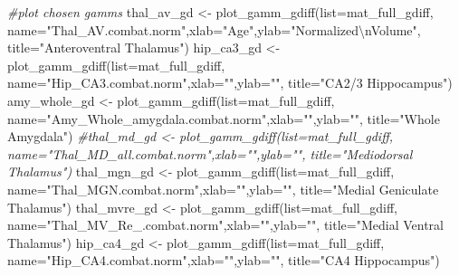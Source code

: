 \documentclass[
]{article}
\newenvironment{Shaded}{\begin{snugshade}}{\end{snugshade}}
\newcommand{\AttributeTok}[1]{\textcolor[rgb]{0.77,0.63,0.00}{#1}}
\newcommand{\CommentTok}[1]{\textcolor[rgb]{0.56,0.35,0.01}{\textit{#1}}}
\newcommand{\FunctionTok}[1]{\textcolor[rgb]{0.00,0.00,0.00}{#1}}
\newcommand{\NormalTok}[1]{#1}
\newcommand{\OtherTok}[1]{\textcolor[rgb]{0.56,0.35,0.01}{#1}}
\newcommand{\SpecialCharTok}[1]{\textcolor[rgb]{0.00,0.00,0.00}{#1}}
\newcommand{\StringTok}[1]{\textcolor[rgb]{0.31,0.60,0.02}{#1}}
\begin{document}
\begin{Shaded}
\begin{Highlighting}[]
\CommentTok{\#plot chosen gamms}
\NormalTok{thal\_av\_gd }\OtherTok{\textless{}{-}} \FunctionTok{plot\_gamm\_gdiff}\NormalTok{(}\AttributeTok{list=}\NormalTok{mat\_full\_gdiff, }\AttributeTok{name=}\StringTok{"Thal\_AV.combat.norm"}\NormalTok{,}\AttributeTok{xlab=}\StringTok{"Age"}\NormalTok{,}\AttributeTok{ylab=}\StringTok{"Normalized}\SpecialCharTok{\textbackslash{}n}\StringTok{Volume"}\NormalTok{, }\AttributeTok{title=}\StringTok{"Anteroventral Thalamus"}\NormalTok{)}
\NormalTok{hip\_ca3\_gd }\OtherTok{\textless{}{-}} \FunctionTok{plot\_gamm\_gdiff}\NormalTok{(}\AttributeTok{list=}\NormalTok{mat\_full\_gdiff, }\AttributeTok{name=}\StringTok{"Hip\_CA3.combat.norm"}\NormalTok{,}\AttributeTok{xlab=}\StringTok{""}\NormalTok{,}\AttributeTok{ylab=}\StringTok{""}\NormalTok{, }\AttributeTok{title=}\StringTok{"CA2/3 Hippocampus"}\NormalTok{)}
\NormalTok{amy\_whole\_gd }\OtherTok{\textless{}{-}} \FunctionTok{plot\_gamm\_gdiff}\NormalTok{(}\AttributeTok{list=}\NormalTok{mat\_full\_gdiff, }\AttributeTok{name=}\StringTok{"Amy\_Whole\_amygdala.combat.norm"}\NormalTok{,}\AttributeTok{xlab=}\StringTok{""}\NormalTok{,}\AttributeTok{ylab=}\StringTok{""}\NormalTok{, }\AttributeTok{title=}\StringTok{"Whole Amygdala"}\NormalTok{)}
\CommentTok{\#thal\_md\_gd \textless{}{-} plot\_gamm\_gdiff(list=mat\_full\_gdiff, name="Thal\_MD\_all.combat.norm",xlab="",ylab="", title="Mediodorsal Thalamus")}
\NormalTok{thal\_mgn\_gd }\OtherTok{\textless{}{-}} \FunctionTok{plot\_gamm\_gdiff}\NormalTok{(}\AttributeTok{list=}\NormalTok{mat\_full\_gdiff, }\AttributeTok{name=}\StringTok{"Thal\_MGN.combat.norm"}\NormalTok{,}\AttributeTok{xlab=}\StringTok{""}\NormalTok{,}\AttributeTok{ylab=}\StringTok{""}\NormalTok{, }\AttributeTok{title=}\StringTok{"Medial Geniculate Thalamus"}\NormalTok{)}
\NormalTok{thal\_mvre\_gd }\OtherTok{\textless{}{-}} \FunctionTok{plot\_gamm\_gdiff}\NormalTok{(}\AttributeTok{list=}\NormalTok{mat\_full\_gdiff, }\AttributeTok{name=}\StringTok{"Thal\_MV\_Re\_.combat.norm"}\NormalTok{,}\AttributeTok{xlab=}\StringTok{""}\NormalTok{,}\AttributeTok{ylab=}\StringTok{""}\NormalTok{, }\AttributeTok{title=}\StringTok{"Medial Ventral Thalamus"}\NormalTok{)}
\NormalTok{hip\_ca4\_gd }\OtherTok{\textless{}{-}} \FunctionTok{plot\_gamm\_gdiff}\NormalTok{(}\AttributeTok{list=}\NormalTok{mat\_full\_gdiff, }\AttributeTok{name=}\StringTok{"Hip\_CA4.combat.norm"}\NormalTok{,}\AttributeTok{xlab=}\StringTok{""}\NormalTok{,}\AttributeTok{ylab=}\StringTok{""}\NormalTok{, }\AttributeTok{title=}\StringTok{"CA4 Hippocampus"}\NormalTok{)}


\end{Highlighting}
\end{Shaded}
\end{document}
